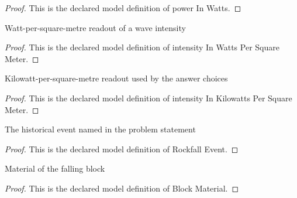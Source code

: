 \begin{proof}
  This is the declared model definition of power In Watts.
\end{proof}
\begin{definition}
  \label{def:physics:phyx-mini-0326:phyxminiproblems-problemphyxmini0326-intensityinwattspersquaremeter}
  Watt-per-square-metre readout of a wave intensity
\end{definition}
\begin{proof}
  This is the declared model definition of intensity In Watts Per Square Meter.
\end{proof}
\begin{definition}
  \label{def:physics:phyx-mini-0326:phyxminiproblems-problemphyxmini0326-intensityinkilowattspersquaremeter}
  Kilowatt-per-square-metre readout used by the answer choices
\end{definition}
\begin{proof}
  This is the declared model definition of intensity In Kilowatts Per Square Meter.
\end{proof}
\begin{definition}
  \label{def:physics:phyx-mini-0326:phyxminiproblems-problemphyxmini0326-rockfallevent}
  The historical event named in the problem statement
\end{definition}
\begin{proof}
  This is the declared model definition of Rockfall Event.
\end{proof}
\begin{definition}
  \label{def:physics:phyx-mini-0326:phyxminiproblems-problemphyxmini0326-blockmaterial}
  Material of the falling block
\end{definition}
\begin{proof}
  This is the declared model definition of Block Material.
\end{proof}
